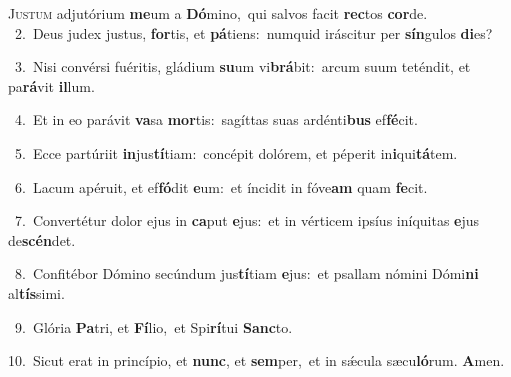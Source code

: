 \lettrine{\initial\textcolor{\initialcolor}{J}}{ustum} adjutórium \textbf{me}\-um a \textbf{Dó}\-mino,~\star qui salvos facit \textbf{rec}\-tos \textbf{cor}\-de.\\
{\numbfont\textcolor{\numbcolor}{~2.}}~Deus judex justus, \textbf{for}\-tis, et \textbf{pá}\-tiens:~\star numquid iráscitur per \textbf{sín}\-gulos \textbf{di}\-es?\par
{\numbfont\textcolor{\numbcolor}{~3.}}~Nisi convérsi fuéritis, gládium \textbf{su}\-um vi\-\textbf{brá}\-bit:~\star arcum suum teténdit, et pa\-\textbf{rá}\-vit \textbf{il}\-lum.\par
{\numbfont\textcolor{\numbcolor}{~4.}}~Et in eo parávit \textbf{va}\-sa \textbf{mor}\-tis:~\star sagíttas suas ardénti\textbf{bus} ef\-\textbf{fé}\-cit.\par
{\numbfont\textcolor{\numbcolor}{~5.}}~Ecce partúriit \textbf{in}\-jus\-\textbf{tí}\-tiam:~\star concépit dolórem, et péperit in\-\textbf{i}\-qui\-\textbf{tá}\-tem.\par
{\numbfont\textcolor{\numbcolor}{~6.}}~Lacum apéruit, et ef\-\textbf{fó}\-dit \textbf{e}\-um:~\star et íncidit in fóve\textbf{am} quam \textbf{fe}\-cit.\par
{\numbfont\textcolor{\numbcolor}{~7.}}~Convertétur dolor ejus in \textbf{ca}\-put \textbf{e}\-jus:~\star et in vérticem ipsíus iníquitas \textbf{e}\-jus de\-\textbf{scén}\-det.\par
{\numbfont\textcolor{\numbcolor}{~8.}}~Confitébor Dómino secúndum jus\-\textbf{tí}\-tiam \textbf{e}\-jus:~\star et psallam nómini Dómi\textbf{ni} al\-\textbf{tís}\-simi.\par
{\numbfont\textcolor{\numbcolor}{~9.}}~Glória \textbf{Pa}\-tri, et \textbf{Fí}\-lio,~\star et Spi\-\textbf{rí}\-tui \textbf{Sanc}\-to.\par
{\numbfont\textcolor{\numbcolor}{10.}}~Sicut erat in princípio, et \textbf{nunc}\-, et \textbf{sem}\-per,~\star et in sǽcula sæcu\-\textbf{ló}\-rum. \textbf{A}\-men.\par
